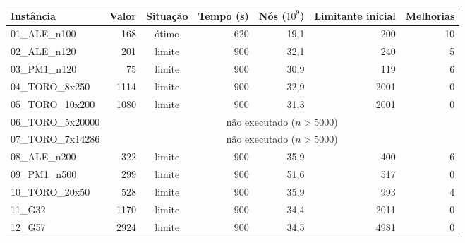 \begin{tabular}{lrcrrrr}\hline
Instância & Valor & Situação & Tempo (s) & Nós ($10^9$) & Limitante inicial & Melhorias \\\hline
01\_ALE\_n100 & 168 & ótimo & 620 & 19{,}1 & 200 & 10 \\
02\_ALE\_n120 & 201 & limite & 900 & 32{,}1 & 240 & 5 \\
03\_PM1\_n120 & 75 & limite & 900 & 30{,}9 & 119 & 6 \\
04\_TORO\_8x250 & 1114 & limite & 900 & 32{,}9 & 2001 & 0 \\
05\_TORO\_10x200 & 1080 & limite & 900 & 31{,}3 & 2001 & 0 \\
06\_TORO\_5x20000 & \multicolumn{6}{c}{não executado ($n>5000$)} \\
07\_TORO\_7x14286 & \multicolumn{6}{c}{não executado ($n>5000$)} \\
08\_ALE\_n200 & 322 & limite & 900 & 35{,}9 & 400 & 6 \\
09\_PM1\_n500 & 299 & limite & 900 & 51{,}6 & 517 & 0 \\
10\_TORO\_20x50 & 528 & limite & 900 & 35{,}9 & 993 & 4 \\
11\_G32 & 1170 & limite & 900 & 34{,}4 & 2011 & 0 \\
12\_G57 & 2924 & limite & 900 & 34{,}5 & 4981 & 0 \\
\hline\end{tabular}
